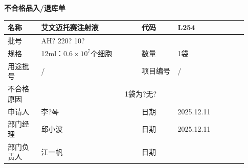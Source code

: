 \documentclass[UTF8,10pt,a4paper,fontset=fandol]{ctexart}
\newcommand{\fieldvalue}[1]{#1}
\newcommand{\handwritten}[1]{#1}
\begin{document}
\begin{center}
\textbf{不合格品入/退库单}
\end{center}

\small
\begin{tabular}{|p{0.13\linewidth}|p{0.39\linewidth}|p{0.14\linewidth}|p{0.27\linewidth}|}
\hline
名称 &
\fieldvalue{\handwritten{艾文迈托赛注射液}} &
代码 &
\fieldvalue{\handwritten{L254}} \\
\hline
批号 &
\fieldvalue{\handwritten{AH? 220? 10?}} &
\multicolumn{2}{c|}{} \\
\hline
规格 &
\fieldvalue{\handwritten{12ml：$0.6\times10^{7}$个细胞}} &
数量 &
\fieldvalue{\handwritten{1袋}} \\
\hline
用途批号 &
\fieldvalue{\handwritten{/}} &
项目编号 &
\fieldvalue{\handwritten{/}} \\
\hline
不合格原因 &
\multicolumn{3}{c|}{
\fieldvalue{\handwritten{1袋为?无?}}
} \\
\hline
申请人 &
\fieldvalue{\handwritten{李?琴}} &
日期 &
\fieldvalue{\handwritten{2025.12.11}} \\
\hline
部门经理 &
\fieldvalue{\handwritten{邱小波}} &
日期 &
\fieldvalue{\handwritten{2025.12.11}} \\
\hline
部门负责人 &
\fieldvalue{\handwritten{江一帆}} &
日期 &

\end{tabular}
\end{document}
